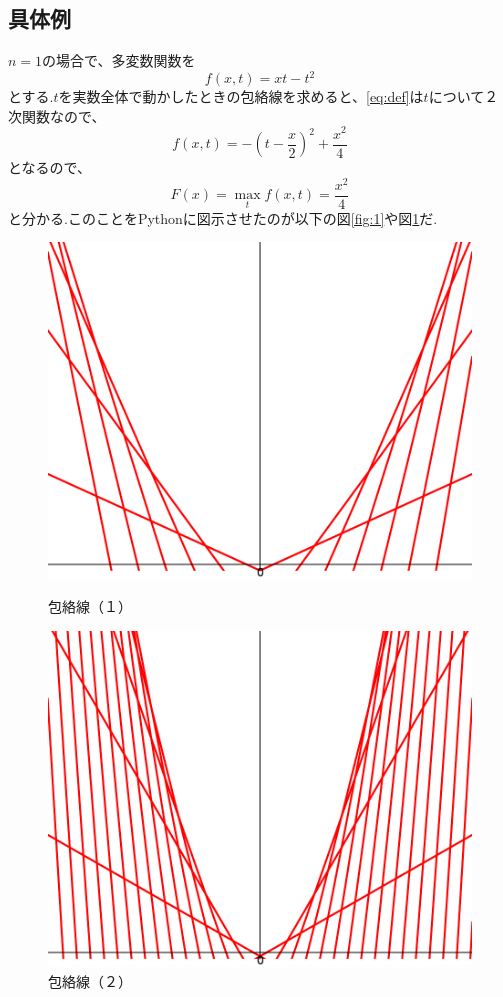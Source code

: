 \documentclass[11pt,a4j,fleqn]{jarticle}
\begin{document}
\subsection{具体例}

$n=1$の場合で、多変数関数を
\begin{equation}
 f(x,t)=xt-t^2 \label{eq:def}
\end{equation}
とする.$t$を実数全体で動かしたときの包絡線を求めると、\eqref{eq:def}は$t$について２次関数なので、
\begin{equation*}
 f(x,t)=-\left(t-\frac{x}{2}\right)^2+\frac{x^2}{4}
\end{equation*}
となるので、
\begin{equation*}
 F(x)=\max_t f(x,t)=\frac{x^2}{4}
\end{equation*}
と分かる.このことをPythonに図示させたのが以下の図\ref{fig:1}や図\ref{fig:2}だ.
\begin{figure}[htb]
 \centering
 \includegraphics[scale=0.4]{envelope0.pdf}
 \caption{包絡線（１）}
 \label{fig:1}
 \centering
 \includegraphics[scale=0.4]{envelope1.pdf}
 \caption{包絡線（２）}
 \label{fig:2}
\end{figure}
\end{document}
